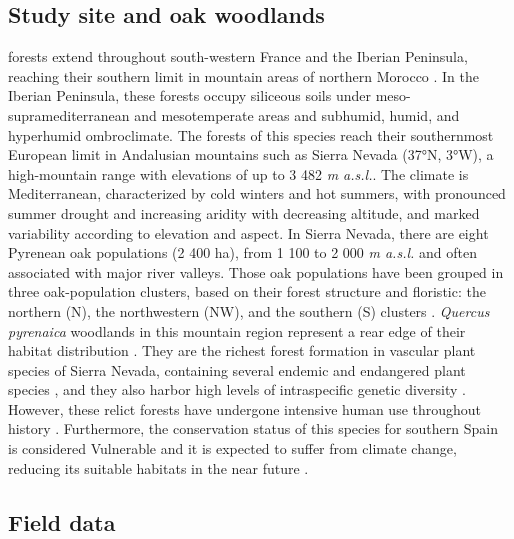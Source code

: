\subsection{Study site and oak woodlands}\label{sec:carbon:mat-studysite}

\Qpy forests extend throughout south-western France and the Iberian Peninsula, reaching their southern limit in mountain areas of northern Morocco \autocite{Franco1990Quercus}. In the Iberian Peninsula, these forests occupy siliceous soils under meso-supramediterranean and mesotemperate areas and subhumid, humid, and hyperhumid ombroclimate. The forests of this species reach their southernmost European limit in Andalusian mountains such as Sierra Nevada (37°N, 3°W), a high-mountain range with elevations of up to 3 482 \emph{m a.s.l.}. The climate is Mediterranean, characterized by cold winters and hot summers, with pronounced summer drought and increasing aridity with decreasing altitude, and marked variability according to elevation and aspect. In Sierra Nevada, there are eight Pyrenean oak populations (2 400 ha), from 1 100 to 2 000 \emph{m a.s.l.} and often associated with major river valleys. Those oak populations have been grouped in three oak-population clusters, based on their forest structure and floristic: the northern (N), the northwestern (NW), and the southern (S) clusters \autocite{PerezLuqueetal2021EcologicalDiversity}. \emph{Quercus pyrenaica} woodlands in this mountain region represent a rear edge of their habitat distribution \autocite{HampePetit2005ConservingBiodiversity}. They are the richest forest formation in vascular plant species of Sierra Nevada, containing several endemic and endangered plant species \autocite{Loriteetal2008PhytosociologicalReview}, and they also harbor high levels of intraspecific genetic diversity \autocite{ValbuenaCarabanaGil2013GeneticResilience}. However, these relict forests have undergone intensive human use throughout history \autocite{CamachoOlmedoetal2002DinamicaEvolutiva}. Furthermore, the conservation status of this species for southern Spain is considered Vulnerable and it is expected to suffer from climate change, reducing its suitable habitats in the near future \autocite{GeaIzquierdoetal2013GrowthProjections,GeaIzquierdoetal2017RiskyFuture,Benitoetal2011SimulatingPotential}.

\subsection{Field data}\label{sec:carbon:mat-field-data}

